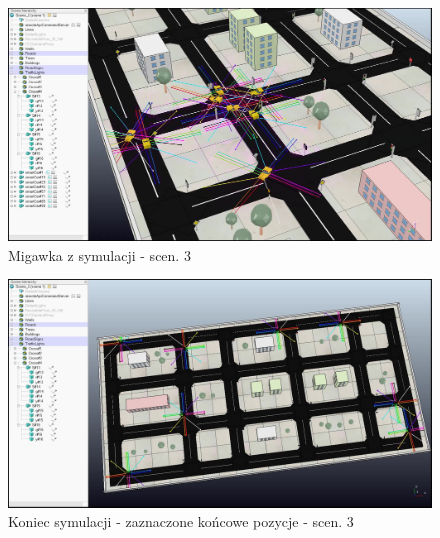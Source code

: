  \begin{figure}[!h]
	\centering
	\centering
	\includegraphics[width=.8\linewidth]{p32.jpg}
	\caption{Migawka z symulacji - scen. 3}
	\label{fig:p32}
\end{figure}

 \begin{figure}[!h]
	\centering
	\centering
	\includegraphics[width=.8\linewidth]{p33.jpg}
	\caption{Koniec symulacji - zaznaczone końcowe pozycje - scen. 3}
	\label{fig:p33}
\end{figure}
 
 
 
